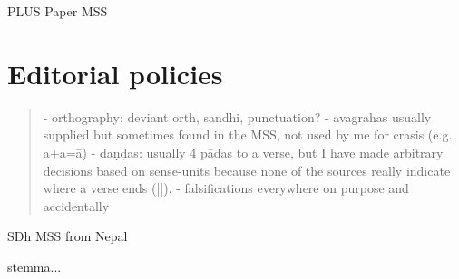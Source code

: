 PLUS Paper MSS

\vfill
\pagebreak


\section{Editorial policies}

\begin{quote}
- orthography: deviant orth, sandhi, punctuation?
- avagrahas usually supplied but sometimes found in the MSS, not used by me for crasis (e.g. a+a=ā)
- daṇḍas: usually 4 pādas to a verse, but I have made arbitrary decisions based on sense-units 
  because none of the sources really indicate where a verse ends (||).
- falsifications everywhere on purpose and accidentally
\end{quote}

SDh MSS from Nepal

stemma...


